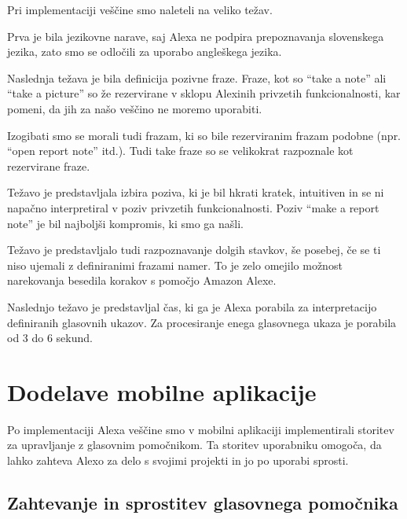 \documentclass[a4paper, 12pt]{book}
\begin{document}
Pri implementaciji veščine smo naleteli na veliko težav.

Prva je bila jezikovne narave, saj Alexa ne podpira prepoznavanja slovenskega jezika, zato smo se odločili za uporabo angleškega jezika.

Naslednja težava je bila definicija pozivne fraze.
Fraze, kot so \enquote{take a note} ali \enquote{take a picture} so že rezervirane v sklopu Alexinih privzetih funkcionalnosti, kar pomeni, da jih za našo veščino ne moremo uporabiti.

Izogibati smo se morali tudi frazam, ki so bile rezerviranim frazam podobne (npr. \enquote{open report note} itd.).
Tudi take fraze so se velikokrat razpoznale kot rezervirane fraze.

Težavo je predstavljala izbira poziva, ki je bil hkrati kratek, intuitiven in se ni napačno interpretiral v poziv privzetih funkcionalnosti.
Poziv \enquote{make a report note} je bil najboljši kompromis, ki smo ga našli.

Težavo je predstavljalo tudi razpoznavanje dolgih stavkov, še posebej, če se ti niso ujemali z definiranimi frazami namer.
To je zelo omejilo možnost narekovanja besedila korakov s pomočjo Amazon Alexe.

Naslednjo težavo je predstavljal čas, ki ga je Alexa porabila za interpretacijo definiranih glasovnih ukazov.
Za procesiranje enega glasovnega ukaza je porabila od 3 do 6 sekund.












\section{Dodelave mobilne aplikacije}

Po implementaciji Alexa veščine smo v mobilni aplikaciji implementirali storitev za upravljanje z glasovnim pomočnikom.
Ta storitev uporabniku omogoča, da lahko zahteva Alexo za delo s svojimi projekti in jo po uporabi sprosti.


\subsection{Zahtevanje in sprostitev glasovnega pomočnika}
\end{document}
